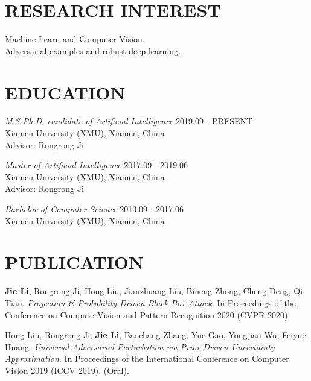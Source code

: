 \documentclass[margin, 10pt]{res} %
\begin{document}
\begin{resume}


\section{RESEARCH INTEREST}
Machine Learn and Computer Vision. \\
Adversarial examples and robust deep learning.



\section{EDUCATION}

{\sl M.S-Ph.D. candidate of Artificial Intelligence} \hfill 2019.09 - PRESENT \\
Xiamen University (XMU), Xiamen, China \\
Advisor: Rongrong Ji

{\sl Master of Artificial Intelligence} \hfill 2017.09 - 2019.06 \\
Xiamen University (XMU), Xiamen, China \\
Advisor: Rongrong Ji

{\sl Bachelor of Computer Science} \hfill 2013.09 - 2017.06 \\
Xiamen University (XMU), Xiamen, China

\section{PUBLICATION}

\textbf{Jie Li}, Rongrong Ji, Hong Liu, Jianzhuang Liu, Bineng Zhong, Cheng Deng, Qi Tian. \textit{Projection \& Probability-Driven Black-Box Attack}.
In Proceedings of the Conference on ComputerVision and Pattern Recognition 2020 (CVPR 2020).

Hong Liu, Rongrong Ji, \textbf{Jie Li}, Baochang Zhang, Yue Gao, Yongjian Wu, Feiyue Huang. \textit{Universal Adversarial Perturbation via Prior Driven Uncertainty Approximation}.
In Proceedings of the International Conference on Computer Vision 2019 (ICCV 2019). (Oral).


\end{resume}
\end{document}
